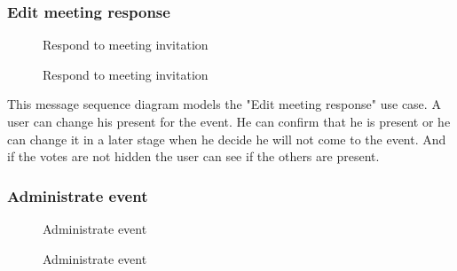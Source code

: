 	\subsubsection{Edit meeting response}
		\begin{figure}[H]
			\centering
			\begin{msc}{Respond to meeting invitation}

				\nextlevel
				\nextlevel

				\nextlevel
				\nextlevel

				\nextlevel
				\nextlevel
				\nextlevel
				\nextlevel
				\nextlevel
				
				\nextlevel
			\end{msc}
			\caption{Respond to meeting invitation}
			\label{msc:respondinvite}
		\end{figure}

		This message sequence diagram models the "Edit meeting response" use case. A user can change his present for the event. He can confirm that he is present or he can change it in a later stage when he decide he will not come to the event. And if the votes are not hidden the user can see if the others are present. 

	\subsubsection{Administrate event}
		\begin{figure}[H]
			\centering
			\begin{msc}{Administrate event}

				\nextlevel
				\nextlevel
				\nextlevel
			\end{msc}
			\caption{Administrate event}
			\label{msc:adminevent}
		\end{figure}

